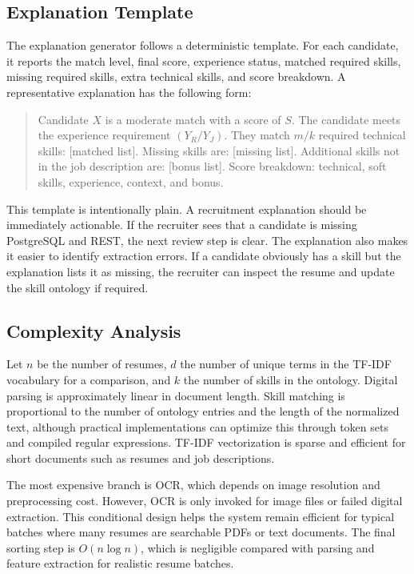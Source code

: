 \documentclass[conference]{IEEEtran}
\begin{document}
\subsection{Explanation Template}
The explanation generator follows a deterministic template. For each candidate, it reports the match level, final score, experience status, matched required skills, missing required skills, extra technical skills, and score breakdown. A representative explanation has the following form:

\begin{quote}
Candidate \(X\) is a moderate match with a score of \(S\). The candidate meets the experience requirement \((Y_R/Y_J)\). They match \(m/k\) required technical skills: [matched list]. Missing skills are: [missing list]. Additional skills not in the job description are: [bonus list]. Score breakdown: technical, soft skills, experience, context, and bonus.
\end{quote}

This template is intentionally plain. A recruitment explanation should be immediately actionable. If the recruiter sees that a candidate is missing PostgreSQL and REST, the next review step is clear. The explanation also makes it easier to identify extraction errors. If a candidate obviously has a skill but the explanation lists it as missing, the recruiter can inspect the resume and update the skill ontology if required.

\subsection{Complexity Analysis}
Let \(n\) be the number of resumes, \(d\) the number of unique terms in the TF-IDF vocabulary for a comparison, and \(k\) the number of skills in the ontology. Digital parsing is approximately linear in document length. Skill matching is proportional to the number of ontology entries and the length of the normalized text, although practical implementations can optimize this through token sets and compiled regular expressions. TF-IDF vectorization is sparse and efficient for short documents such as resumes and job descriptions.

The most expensive branch is OCR, which depends on image resolution and preprocessing cost. However, OCR is only invoked for image files or failed digital extraction. This conditional design helps the system remain efficient for typical batches where many resumes are searchable PDFs or text documents. The final sorting step is \(O(n\log n)\), which is negligible compared with parsing and feature extraction for realistic resume batches.
\end{document}
